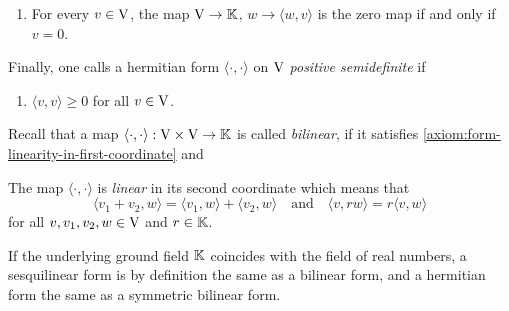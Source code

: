 \begin{definition}
\begin{enumerate}[label={\textup{({\sffamily SF\arabic*w)}}},leftmargin=*,resume]
\item
\label{axiom:form-weakly-nondegenerate} 
  For every $v\in \mathrm{V}$, the map $\mathrm{V} \to \mathbb{K}$, $w \to \langle w,v \rangle$ is the zero 
  map if and only if $v=0$.
\end{enumerate}
Finally, one calls a hermitian form  $\langle \cdot , \cdot \rangle$ on $\mathrm{V}$   
\emph{positive semidefinite} if
\begin{enumerate}[label={\textup{({\sffamily SF\arabic*s})}},leftmargin=*,resume]
\item
\label{axiom:form-positive-semidefinite} 
  $\langle v,v \rangle \geq 0$ for all $v\in \mathrm{V}$.
\end{enumerate}
\end{definition}

\begin{remark}
Recall that a map  $\langle \cdot , \cdot \rangle : \mathrm{V} \times \mathrm{V} \to \mathbb{K}$ is called \emph{bilinear},
if it satisfies \ref{axiom:form-linearity-in-first-coordinate} and 
\begin{axiomlist}[BF]
\item
 \label{axiom:form-linearity-in-second-coordinate} 
  The map $\langle \cdot , \cdot \rangle$ is \emph{linear} in its second coordinate which means that
  \[
    \langle v_1 + v_2, w \rangle =  \langle  v_1, w \rangle + \langle v_2, w \rangle
    \quad \text{and} \quad \langle  v, r w \rangle = r \langle v, w \rangle
  \]
  for all  $v, v_1,v_2, w \in \mathrm{V}$ and $r\in \mathbb{K}$.
\end{axiomlist}
If the underlying ground field $\mathbb{K}$ coincides with the field of real numbers, 
a sesquilinear form is by definition the same as a bilinear form,
and a hermitian form the same as a symmetric bilinear form. 
\end{remark}

